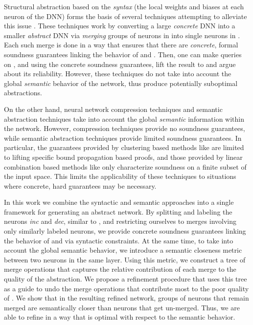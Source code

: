 Structural abstraction based on the \textit{syntax} (the local weights and
biases at each neuron of the DNN) forms the basis of several techniques
attempting to alleviate this issue
\cite{cegar-nn,cegarette,cleverest-nn,conv-abs-gk}. These techniques work by
converting a large \textit{concrete}
DNN \cnc into a smaller \textit{abstract} DNN \abs via \textit{merging} groups
of neurons in \cnc into single neurons in \abs. Each such merge is done in a
way that ensures that there are \textit{concrete}, formal soundness guarantees
linking the behavior of \cnc and \abs. Then, one can make queries on \abs, and
using the concrete soundness guarantees, lift the result to \cnc and argue
about its reliability. However, these techniques do not take into account the
global \textit{semantic} behavior of the network, thus produce potentially
suboptimal abstractions.

On the other hand, neural network compression techniques \cite{dnn-compression}
and semantic abstraction techniques \cite{deep-abstract,lin-comb-abs-jan} take
into account the global \textit{semantic} information within the network.
However, compression techniques provide no soundness guarantees, while 
semantic abstraction techniques provide limited soundness guarantees. In
particular, the guarantees provided by clustering based methods like
\cite{deep-abstract} are limited to
lifting specific bound propagation based proofs, and those provided by
linear combination based methods like \cite{lin-comb-abs-jan} only characterize
soundness on a finite subset of the
input space. This limits the applicability of these techniques to situations
where concrete, hard guarantees may be necessary.

In this work we combine the syntactic and semantic approaches into a single
framework for generating an abstract network. By splitting and labeling the
neurons \textit{inc} and \textit{dec}, similar to \cite{cegar-nn}, and
restricting ourselves to merges involving only similarly labeled neurons, we
provide concrete soundness guarantees linking the behavior of \cnc and \abs via
syntactic constraints. At the same time, to take into account the global
semantic behavior, we introduce a semantic closeness metric between two neurons
in the same layer.  Using this metric, we construct a tree of merge operations
that captures the relative contribution of each merge to the quality of the
abstraction. We propose a refinement procedure that uses this tree as a guide
to undo the merge operations that contribute most to the poor quality of \abs.
We show that in the resulting refined network, groups of neurons that remain
merged are semantically closer than neurons that get un-merged. Thus, we are
able to refine \abs in a way that is optimal with respect to the semantic
behavior.

